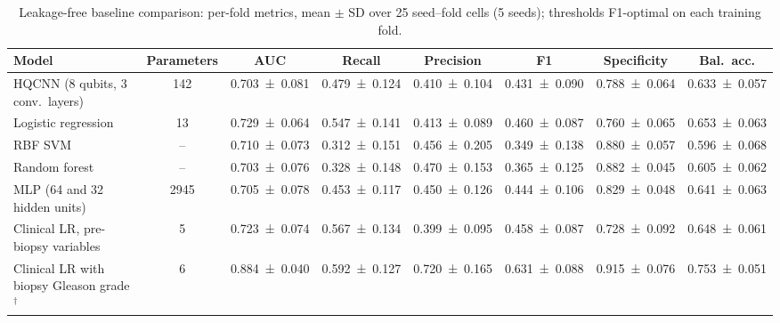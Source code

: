 \begin{table}[tbp]
\centering
\caption{Leakage-free baseline comparison: per-fold metrics, mean $\pm$ SD over 25 seed--fold cells (5 seeds); thresholds F1-optimal on each training fold.}
\label{tab:s_p1_cv}
\scriptsize\setlength{\tabcolsep}{3pt}
\begin{tabular}{>{\raggedright\arraybackslash}p{3.6cm}ccccccc}
\toprule
Model & Parameters & AUC & Recall & Precision & F1 & Specificity & Bal.\ acc. \\
\midrule
HQCNN (8 qubits, 3 conv.\ layers) & \num{142} & \num{0.703 \pm 0.081} & \num{0.479 \pm 0.124} & \num{0.410 \pm 0.104} & \num{0.431 \pm 0.090} & \num{0.788 \pm 0.064} & \num{0.633 \pm 0.057} \\
Logistic regression & \num{13} & \num{0.729 \pm 0.064} & \num{0.547 \pm 0.141} & \num{0.413 \pm 0.089} & \num{0.460 \pm 0.087} & \num{0.760 \pm 0.065} & \num{0.653 \pm 0.063} \\
RBF SVM & -- & \num{0.710 \pm 0.073} & \num{0.312 \pm 0.151} & \num{0.456 \pm 0.205} & \num{0.349 \pm 0.138} & \num{0.880 \pm 0.057} & \num{0.596 \pm 0.068} \\
Random forest & -- & \num{0.703 \pm 0.076} & \num{0.328 \pm 0.148} & \num{0.470 \pm 0.153} & \num{0.365 \pm 0.125} & \num{0.882 \pm 0.045} & \num{0.605 \pm 0.062} \\
MLP (64 and 32 hidden units) & \num{2945} & \num{0.705 \pm 0.078} & \num{0.453 \pm 0.117} & \num{0.450 \pm 0.126} & \num{0.444 \pm 0.106} & \num{0.829 \pm 0.048} & \num{0.641 \pm 0.063} \\
Clinical LR, pre-biopsy variables & \num{5} & \num{0.723 \pm 0.074} & \num{0.567 \pm 0.134} & \num{0.399 \pm 0.095} & \num{0.458 \pm 0.087} & \num{0.728 \pm 0.092} & \num{0.648 \pm 0.061} \\
Clinical LR with biopsy Gleason grade$^{\dagger}$ & \num{6} & \num{0.884 \pm 0.040} & \num{0.592 \pm 0.127} & \num{0.720 \pm 0.165} & \num{0.631 \pm 0.088} & \num{0.915 \pm 0.076} & \num{0.753 \pm 0.051} \\
\bottomrule
\end{tabular}
\par{}
\end{table}
